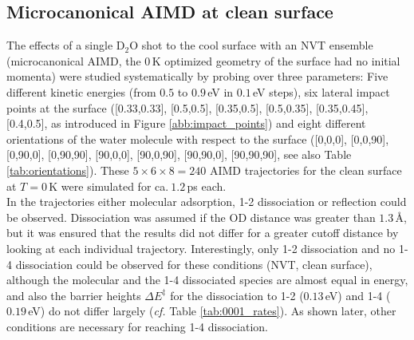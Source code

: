 \documentclass[11pt,DIV=13,BCOR=5mm,a4paper,headinclude]{scrbook}
\begin{document}
\subsection{Microcanonical AIMD at clean surface}\label{sec:mic_clean}
The effects of a single D$_2$O shot to the cool surface with an NVT ensemble (microcanonical AIMD, the $0\,$K optimized geometry of the surface had no initial momenta) were studied systematically by probing over three parameters: Five different kinetic energies (from $0.5$ to $0.9\,$eV in $0.1\,$eV steps), six lateral impact points at the surface ([0.33,0.33], [0.5,0.5], [0.35,0.5], [0.5,0.35], [0.35,0.45], [0.4,0.5], as introduced in Figure \ref{abb:impact_points}) and eight different orientations of the water molecule with respect to the surface ([0,0,0], [0,0,90], [0,90,0], [0,90,90], [90,0,0], [90,0,90], [90,90,0], [90,90,90], see also Table \ref{tab:orientations}).
These $5\times 6\times 8=240$ AIMD trajectories for the clean surface at $T=0\,$K were simulated for ca.$~1.2\,$ps each.
\\
In the trajectories  either molecular adsorption, 1-2 dissociation or reflection could be observed.
Dissociation was assumed if the OD distance was greater than $1.3\,$\AA{}, but it was ensured that the results did not differ for a greater cutoff distance by looking at each individual trajectory.
Interestingly, only 1-2 dissociation and no 1-4 dissociation could be observed for these conditions (NVT, clean surface), although the molecular and the 1-4 dissociated species are almost equal in energy, and also the barrier heights $\Delta E^\ddagger$ for the dissociation to 1-2 ($0.13\,$eV) and 1-4 ($0.19\,$eV) do not differ largely (\textit{cf.} Table \ref{tab:0001_rates}).
As shown later, other conditions are necessary for reaching 1-4 dissociation.
\\
\end{document}
